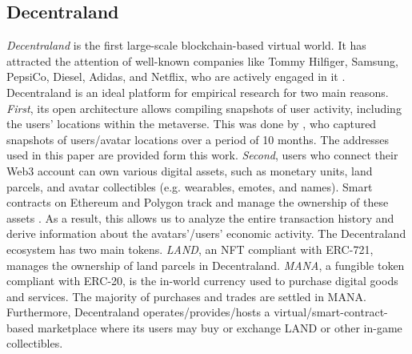 \documentclass[12pt,a4paper,titlepage,oneside,english]{article}
\begin{document}
\subsection{Decentraland}
\textit{Decentraland} is the first large-scale blockchain-based virtual world. It has attracted the attention of well-known companies like Tommy Hilfiger, Samsung, PepsiCo, Diesel, Adidas, and Netflix, who are actively engaged in it  \citep{metaverse-retailing2023}.\newline
Decentraland is an ideal platform for empirical research for two main reasons.
\textit{First}, its open architecture allows compiling snapshots of user activity, including the users' locations  within the metaverse. This was done by \cite{metaverse-retailing2023}, who captured snapshots of users/avatar locations over a period of 10 months. The addresses used in this paper are provided form this work.
\textit{Second}, users who connect their Web3 account can own various digital assets, such as monetary units, land parcels, and avatar collectibles (e.g. wearables, emotes, and names). Smart contracts on Ethereum and Polygon track and manage the ownership of these assets \cite{goldbergschaer2023}. As a result, this allows us to analyze the entire transaction history and derive information about the avatars’/users' economic activity.  \newline 
The Decentraland ecosystem has two main tokens. \textit{LAND}, an NFT compliant with ERC-721, manages the ownership of land parcels in Decentraland. \textit{MANA}, a fungible token compliant with ERC-20, is the in-world currency used to purchase digital goods and services. The majority of purchases and trades are settled in MANA. Furthermore, Decentraland %
operates/provides/hosts a virtual/smart-contract-based marketplace where its users may buy or exchange LAND or other in-game collectibles.
 
\end{document}
